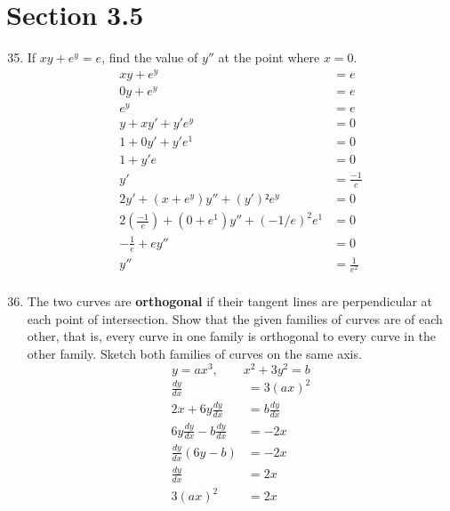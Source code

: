 \documentclass{article}
\begin{document}
\section{Section 3.5}
\begin{enumerate}
\setcounter{enumi}{34}
	\item If $xy+e^y = e$, find the value of $y''$ at the point where $x=0$.\newline
	$$\begin{align}
		xy + e^y &= e \\
0y + e^y &= e \\
e^y &= e \\
y + xy' + y'e^y &= 0 \\
1 + 0y' + y'e^1 &= 0 \\
1 + y'e &= 0 \\
y' &= \frac{-1}{e} \\
2y' + (x + e^y)y'' + (y')²e^y &= 0 \\
2(\frac{-1}{e} ) + (0 + e^1)y'' + (-1/e)^2e^1 &= 0 \\
-\frac{1}{e} + ey'' &= 0 \\
y'' &= \frac{1}{e^2}\\
	\end{align}$$
\setcounter{enumi}{43}
	\item The two curves are \textbf{orthogonal} if their tangent lines are perpendicular at each point of intersection. Show that the given families of curves are  of each other, that is, every curve in one family is orthogonal to every curve in the other family. Sketch both families of curves on the same axis. $$y=ax^3, \qquad x^2 + 3y^2=b$$
		$$\begin{align}
			\frac{dy}{dx}&= 3(ax)^2 \\ 
			2x+6y\frac{dy}{dx} &= b\frac{dy}{dx} \\
			6y\frac{dy}{dx}-b\frac{dy}{dx} &= -2x \\
			\frac{dy}{dx}(6y-b) &= -2x \\
			\frac{dy}{dx} &= 2x \\
			3(ax)^2 &= 2x
		\end{align}$$
\end{enumerate}
\pagebreak
\end{document}
